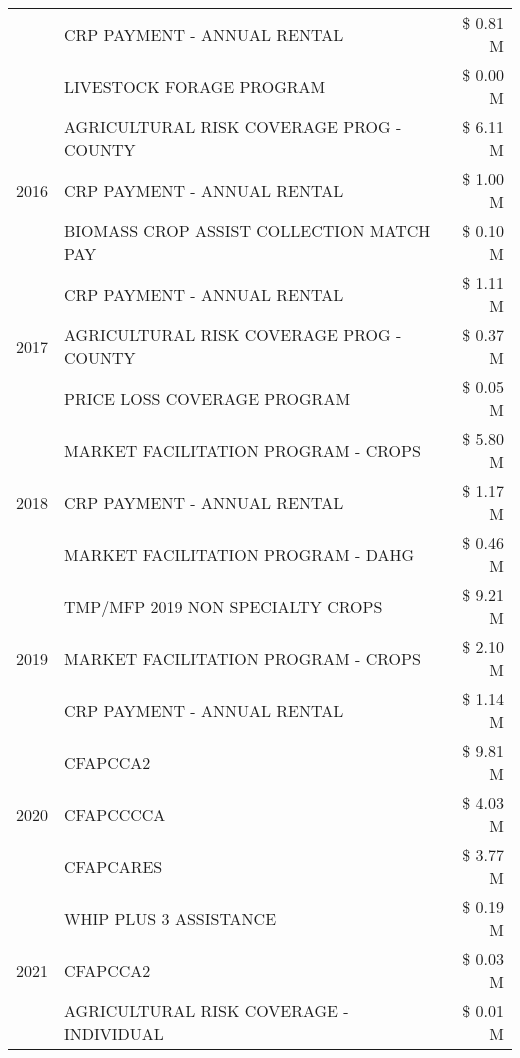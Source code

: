 \begin{tabular}{llr}
 & CRP PAYMENT - ANNUAL RENTAL & \$ 0.81 M \\
 & LIVESTOCK FORAGE PROGRAM & \$ 0.00 M \\
\cline{1-3}
\multirow[t]{3}{*}{2016} & AGRICULTURAL RISK COVERAGE PROG - COUNTY & \$ 6.11 M \\
 & CRP PAYMENT - ANNUAL RENTAL & \$ 1.00 M \\
 & BIOMASS CROP ASSIST COLLECTION MATCH PAY & \$ 0.10 M \\
\cline{1-3}
\multirow[t]{3}{*}{2017} & CRP PAYMENT - ANNUAL RENTAL & \$ 1.11 M \\
 & AGRICULTURAL RISK COVERAGE PROG - COUNTY & \$ 0.37 M \\
 & PRICE LOSS COVERAGE PROGRAM & \$ 0.05 M \\
\cline{1-3}
\multirow[t]{3}{*}{2018} & MARKET FACILITATION PROGRAM - CROPS & \$ 5.80 M \\
 & CRP PAYMENT - ANNUAL RENTAL & \$ 1.17 M \\
 & MARKET FACILITATION PROGRAM - DAHG & \$ 0.46 M \\
\cline{1-3}
\multirow[t]{3}{*}{2019} & TMP/MFP 2019 NON SPECIALTY CROPS & \$ 9.21 M \\
 & MARKET FACILITATION PROGRAM - CROPS & \$ 2.10 M \\
 & CRP PAYMENT - ANNUAL RENTAL & \$ 1.14 M \\
\cline{1-3}
\multirow[t]{3}{*}{2020} & CFAPCCA2 & \$ 9.81 M \\
 & CFAPCCCCA & \$ 4.03 M \\
 & CFAPCARES & \$ 3.77 M \\
\cline{1-3}
\multirow[t]{3}{*}{2021} & WHIP PLUS 3 ASSISTANCE & \$ 0.19 M \\
 & CFAPCCA2 & \$ 0.03 M \\
 & AGRICULTURAL RISK COVERAGE - INDIVIDUAL & \$ 0.01 M \\
\cline{1-3}
\bottomrule
\end{tabular}
